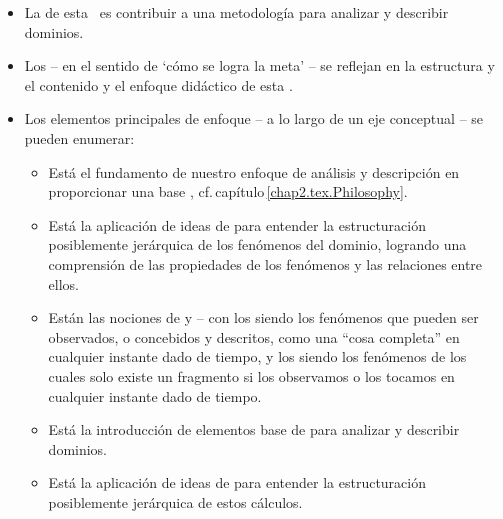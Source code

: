 \vspace*{-4mm}

\begin{itemize}
      \item La  de esta \ es contribuir a una 
      metodología para analizar y describir dominios.
  
\item Los  -- en el sentido de `cómo se logra la meta' -- se reflejan en la estructura y el contenido
      y el enfoque didáctico de esta .
\item Los elementos principales de  enfoque -- a lo largo de un
  eje conceptual -- se pueden enumerar: 
\begin{itemize}
\item Está el fundamento de nuestro enfoque de análisis y descripción
      en proporcionar una base ,
      cf.\,capítulo\,\ref{chap2.tex.Philosophy}. 
\item Está la aplicación de ideas de  
      para entender la estructuración posiblemente jerárquica
      de los fenómenos del dominio, logrando una comprensión de las propiedades
      de los fenómenos y las relaciones entre ellos.
\item Están las nociones de  y  -- %
      con los    siendo los fenómenos
\begynd
\pind que pueden ser observados, o concebidos y descritos, como \nyl una ``cosa completa'' en cualquier instante dado de tiempo,
\afslut
      y los    siendo los fenómenos 
\begynd
\pind de los cuales solo existe un fragmento\pos{}{\\} si los observamos o
      los tocamos\pos{}{\\} en cualquier instante dado de tiempo.
\afslut
\item Está la introducción de elementos base de
         para analizar y
      describir dominios. 
\item Está la aplicación de ideas de  
      para entender la estructuración posiblemente jerárquica
      de estos cálculos. 

\end{itemize}
\end{itemize}
